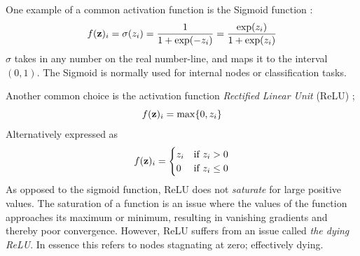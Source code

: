 One example of a common activation function is the Sigmoid function \citep[Logistic Regression]{morten}: 
\begin{equation}\label{sigmoid}
    f(\bold{z})_i=\sigma(z_i)=\frac{1}{1+\exp(-z_i)}=\frac{\exp(z_i)}{1+\exp(z_i)}
\end{equation}
$\sigma$ takes in any number on the real number-line, and maps it to the interval $(0,1)$. The Sigmoid is normally used for internal nodes or classification tasks. 

Another common choice is the activation function \textit{Rectified Linear Unit} (ReLU) \citep[Building a feed forward neural network]{morten}; 
\begin{equation}\label{relu}
    f(\bold{z})_i=\max\{0, z_i\}
\end{equation}
Alternatively expressed as
\begin{equation}
    f(\bold{z})_i = \begin{cases} 
      z_i & \text{if } z_i > 0 \\
      0 & \text{if } z_i \leq 0 
   \end{cases}    
\end{equation}
As opposed to the sigmoid function, ReLU does not \textit{saturate} for large positive values. The saturation of a function is an issue where the values of the function approaches its maximum or minimum, resulting in vanishing gradients and thereby poor convergence. However, ReLU suffers from an issue called \textit{the dying ReLU}. In essence this refers to nodes stagnating at zero; effectively dying. 

